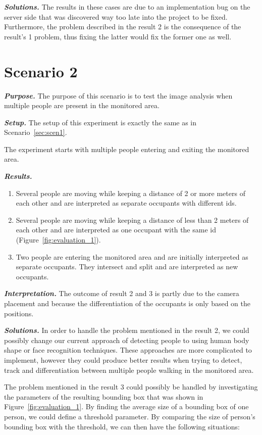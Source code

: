 \textit{\textbf{Solutions.}} The results in these cases are due to an implementation bug on the server side that was discovered way too late into the project to be fixed. Furthermore, the problem described in the result 2 is the consequence of the result's 1 problem, thus fixing the latter would fix the former one as well.

\section{Scenario 2}
\textit{\textbf{Purpose.}} The purpose of this scenario is to test the image analysis when multiple people are present in the monitored area.

\textit{\textbf{Setup.}} The setup of this experiment is exactly the same as in Scenario~\ref{sec:scen1}.

The experiment starts with multiple people entering and exiting the monitored area.

\textit{\textbf{Results.}}
\begin{enumerate}
\item Several people are moving while keeping a distance of 2 or more meters of each other and are interpreted as separate occupants with different ids.
\item Several people are moving while keeping a distance of less than 2 meters of each other and are interpreted as one occupant with the same id (Figure~\ref{fig:evaluation_1}).
\item Two people are entering the monitored area and are initially interpreted as separate occupants. They intersect and split and are interpreted as new occupants.
\end{enumerate}

\textit{\textbf{Interpretation.}} The outcome of result 2 and 3 is partly due to the camera placement and because the differentiation of the occupants is only based on the positions. 

\textit{\textbf{Solutions.}} In order to handle the problem mentioned in the result 2, we could possibly change our current approach of detecting people to using human body shape or face recognition techniques. These approaches are more complicated to implement, however they could produce better results when trying to detect, track and differentiation between multiple people walking in the monitored area.

The problem mentioned in the result 3 could possibly be handled by investigating the parameters of the resulting bounding box that was shown in Figure~\ref{fig:evaluation_1}. By finding the average size of a bounding box of one person, we could define a threshold parameter. By comparing the size of person's bounding box with the threshold, we can then have the following situations:

